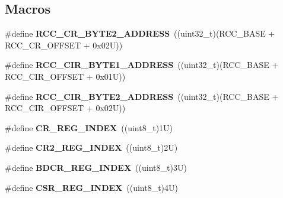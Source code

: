\subsection*{Macros}
\begin{DoxyCompactItemize}
\item 
\mbox{\label{group___r_c_c___private___constants_ga1da336203f39dd57462e7f331271f699}} 
\#define {\bfseries R\+C\+C\+\_\+\+C\+R\+\_\+\+B\+Y\+T\+E2\+\_\+\+A\+D\+D\+R\+E\+SS}~((uint32\+\_\+t)(R\+C\+C\+\_\+\+B\+A\+SE + R\+C\+C\+\_\+\+C\+R\+\_\+\+O\+F\+F\+S\+ET + 0x02\+U))
\item 
\mbox{\label{group___r_c_c___private___constants_ga97f80d22ba3506a43accbeb9ceb31f51}} 
\#define {\bfseries R\+C\+C\+\_\+\+C\+I\+R\+\_\+\+B\+Y\+T\+E1\+\_\+\+A\+D\+D\+R\+E\+SS}~((uint32\+\_\+t)(R\+C\+C\+\_\+\+B\+A\+SE + R\+C\+C\+\_\+\+C\+I\+R\+\_\+\+O\+F\+F\+S\+ET + 0x01\+U))
\item 
\mbox{\label{group___r_c_c___private___constants_ga1387fb2dfadb830eb83ab2772c8d2294}} 
\#define {\bfseries R\+C\+C\+\_\+\+C\+I\+R\+\_\+\+B\+Y\+T\+E2\+\_\+\+A\+D\+D\+R\+E\+SS}~((uint32\+\_\+t)(R\+C\+C\+\_\+\+B\+A\+SE + R\+C\+C\+\_\+\+C\+I\+R\+\_\+\+O\+F\+F\+S\+ET + 0x02\+U))
\item 
\mbox{\label{group___r_c_c___private___constants_ga56feb1abcd35b22427fa55164c585afa}} 
\#define {\bfseries C\+R\+\_\+\+R\+E\+G\+\_\+\+I\+N\+D\+EX}~((uint8\+\_\+t)1\+U)
\item 
\mbox{\label{group___r_c_c___private___constants_ga8046e472578601da13c39af3eb573693}} 
\#define {\bfseries C\+R2\+\_\+\+R\+E\+G\+\_\+\+I\+N\+D\+EX}~((uint8\+\_\+t)2\+U)
\item 
\mbox{\label{group___r_c_c___private___constants_ga114b3e5b2a2cdb5d85f65511fe085a6d}} 
\#define {\bfseries B\+D\+C\+R\+\_\+\+R\+E\+G\+\_\+\+I\+N\+D\+EX}~((uint8\+\_\+t)3\+U)
\item 
\mbox{\label{group___r_c_c___private___constants_gab9507f2d9ee5d477b11363b052cd07c8}} 
\#define {\bfseries C\+S\+R\+\_\+\+R\+E\+G\+\_\+\+I\+N\+D\+EX}~((uint8\+\_\+t)4\+U)

\end{DoxyCompactItemize}
